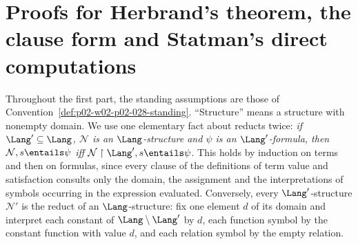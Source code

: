 \section{Proofs for Herbrand's theorem, the clause form and Statman's direct computations}
\label{sec:annex-p02-w02-p02-028}

Throughout the first part, the standing assumptions are those of
Convention~\ref{def:p02-w02-p02-028-standing}.  ``Structure'' means a
structure with nonempty domain.  We use one elementary fact about reducts
twice: \emph{if \(\Lang'\subseteq\Lang\), \(\mathcal N\) is an
\(\Lang\)-structure and \(\psi\) is an \(\Lang'\)-formula, then
\(\mathcal N,s\entails\psi\) iff \(\mathcal N\restriction\Lang',s\entails\psi\)}.
This holds by induction on terms and then on formulas, since every clause of
the definitions of term value and satisfaction consults only the domain, the
assignment and the interpretations of symbols occurring in the expression
evaluated.  Conversely, every \(\Lang'\)-structure \(\mathcal N'\) is the
reduct of an \(\Lang\)-structure: fix one element \(d\) of its domain and
interpret each constant of \(\Lang\setminus\Lang'\) by \(d\), each function
symbol by the constant function with value \(d\), and each relation symbol by
the empty relation.

